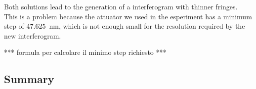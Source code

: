 \documentclass[12pt,a4paper,twoside]{article}
\begin{document}
Both solutions lead to the generation of a interferogram with thinner fringes.
This is a problem because the attuator we used in the esperiment has a minimum step of \SI{47.625}{\nm}, which is not enough small for the resolution required by the new interferogram.

*** formula per calcolare il minimo step richiesto ***


\subsection{Summary}

\clearpage

\end{document}
